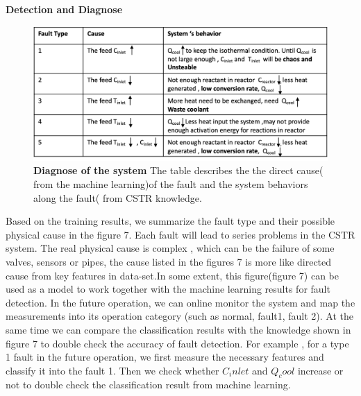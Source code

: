 \documentclass[fleqn,11pt]{wlscirep}
\begin{document}
\textbf{Detection and Diagnose }
\begin{figure}[h]
    \centering
    \includegraphics[width=12cm]{figure7.png}
    \caption{
    \textbf{Diagnose  of the system} The table describes the the direct cause( from the machine learning)of the fault and the system behaviors along the fault( from CSTR knowledge.  }
    \label{fig:1}
\end{figure}

Based on the training results, we summarize the fault type and their possible physical cause in the figure 7. Each fault will lead to series problems in the CSTR system. The real physical cause is complex , which can be the failure of some valves, sensors or pipes, the cause listed in the figures 7 is more like directed cause from key features in data-set.In some extent, this figure(figure 7) can be used as a model to work together with the machine learning results for fault detection. In the future operation, we can online monitor the system and map the measurements into its operation category (such as normal, fault1, fault 2). At the same time we can compare the classification results with the knowledge shown in figure 7 to double check the accuracy of  fault detection. For example , for a type 1 fault in the future operation, we first measure the necessary features and classify it into the fault 1. Then we check whether $C_inlet$ and $Q_cool$ increase or not to double check the classification result from machine learning.
\end{document}
